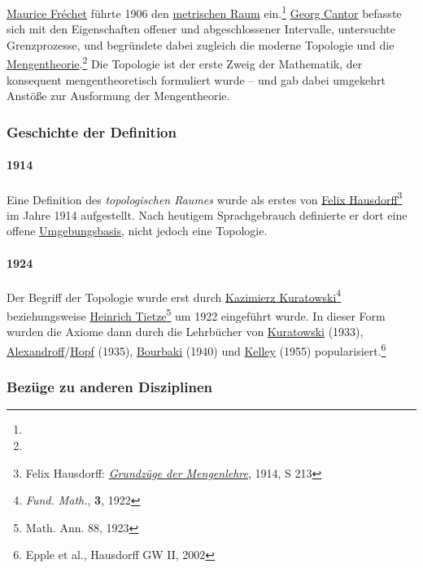 \documentclass[12pt,]{article}
\let\oldparagraph\paragraph
\renewcommand{\paragraph}[1]{\oldparagraph{#1}\mbox{}}
\begin{document}
\href{Maurice_Fréchet}{Maurice Fréchet} führte 1906 den
\href{Metrischer_Raum}{metrischen Raum} ein.\footnote{}
\href{Georg_Cantor}{Georg Cantor} befasste sich mit den Eigenschaften
offener und abgeschlossener Intervalle, untersuchte Grenzprozesse, und
begründete dabei zugleich die moderne Topologie und die
\url{Mengentheorie}.\footnote{} Die Topologie ist der erste Zweig der
Mathematik, der konsequent mengentheoretisch formuliert wurde -- und gab
dabei umgekehrt Anstöße zur Ausformung der Mengentheorie.

\subsubsection{Geschichte der
Definition}\label{geschichte-der-definition}

\paragraph{1914}\label{section}

Eine Definition des \emph{topologischen Raumes} wurde als erstes von
\href{Felix_Hausdorff}{Felix Hausdorff}\footnote{Felix Hausdorff:
  \emph{\href{Grundzüge_der_Mengenlehre}{Grundzüge der Mengenlehre}},
  1914, S 213} im Jahre 1914 aufgestellt. Nach heutigem Sprachgebrauch
definierte er dort eine offene \href{Basis_(Topologie)}{Umgebungsbasis},
nicht jedoch eine Topologie.

\paragraph{1924}\label{section-1}

Der Begriff der Topologie wurde erst durch
\href{Kazimierz_Kuratowski}{Kazimierz Kuratowski}\footnote{\emph{Fund.
  Math.}, \textbf{3}, 1922} beziehungsweise
\href{Heinrich_Tietze}{Heinrich Tietze}\footnote{Math. Ann. 88, 1923} um
1922 eingeführt wurde. In dieser Form wurden die Axiome dann durch die
Lehrbücher von \href{Kazimierz_Kuratowski}{Kuratowski} (1933),
\href{Paul_Alexandroff}{Alexandroff}/\href{Heinz_Hopf}{Hopf} (1935),
\href{Nicolas_Bourbaki}{Bourbaki} (1940) und
\href{John_Leroy_Kelley}{Kelley} (1955) popularisiert.\footnote{Epple et
  al., Hausdorff GW II, 2002}

\subsubsection{Bezüge zu anderen
Disziplinen}\label{bezuxfcge-zu-anderen-disziplinen}
\end{document}
